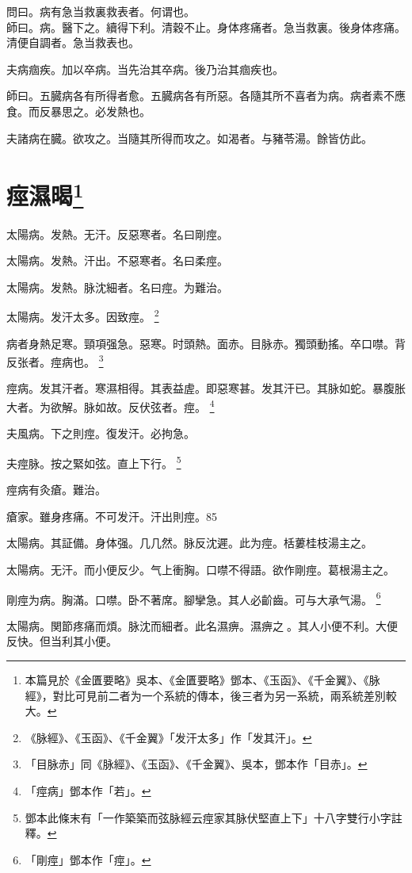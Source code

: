 問曰。病有急当救裏救表者。何谓也。\\
師曰。病。醫下之。續得下利。清穀不止。身体疼痛者。急当救裏。後身体疼痛。清便自調者。急当救表也。

夫病痼疾。加以卒病。当先治其卒病。後乃治其痼疾也。

師曰。五臓病各有所得者愈。五臓病各有所惡。各隨其所不喜者为病。病者素不應食。而反暴思之。必发熱也。

夫諸病在臓。欲攻之。当隨其所得而攻之。如渴者。与豬苓湯。餘皆仿此。

\chapter{痙濕暍\footnote{本篇見於《金匱要略》吳本、《金匱要略》鄧本、《玉函》、《千金翼》、《脉經》，對比可見前二者为一个系統的傳本，後三者为另一系統，兩系統差別較大。}}

太陽病。发熱。无汗。反惡寒者。名曰剛痙。

太陽病。发熱。汗出。不惡寒者。名曰柔痙。

太陽病。发熱。脉沈細者。名曰痙。为難治。

太陽病。发汗太多。因致痙。
	\footnote{
		《脉經》、《玉函》、《千金翼》「发汗太多」作「发其汗」。
	}

病者身熱足寒。頸項强急。惡寒。时頭熱。面赤。目{\khaai 脉}赤。獨頭動搖。卒口噤。背反张者。痙病也。
	\footnote{
		「目脉赤」同《脉經》、《玉函》、《千金翼》、吳本，鄧本作「目赤」。
	}

痙病。发其汗者。寒濕相得。其表益虗。即惡寒甚。发其汗已。其脉如蛇。暴腹胀大者。为欲解。脉如故。反伏弦者。痙。
	\footnote{
		「痙病」鄧本作「若」。
	}

夫風病。下之則痙。復发汗。必拘急。

夫痙脉。按之緊如弦。直上下行。
	\footnote{
		鄧本此條末有「一作築築而弦脉經云痙家其脉伏堅直上下」十八字雙行小字註釋。
	}

痙病有灸瘡。難治。

瘡家。雖身疼痛。不可发汗。汗出則痙。85

太陽病。其証備。身体强。几几然。脉反沈遲。此为痙。栝蔞桂枝湯主之。

太陽病。无汗。而小便反少。气上衝胸。口噤不得語。欲作剛痙。葛根湯主之。

剛痙为病。胸滿。口噤。卧不著席。腳攣急。其人必齘齒。可与大承气湯。
	\footnote{
		「剛痙」鄧本作「痙」。
	}

太陽病。関節疼痛而煩。脉沈而細者。此名濕痹。濕痹之{\sungii 𠊱}。其人小便不利。大便反快。但当利其小便。

